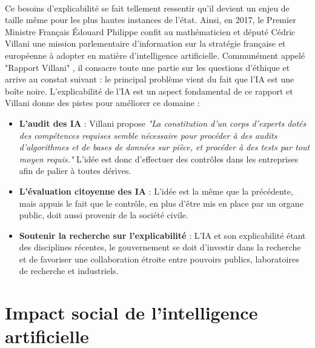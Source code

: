 \paragraph{}Ce besoins d'explicabilité se fait tellement ressentir qu'il devient un enjeu de taille même pour les plus hautes instances de l'état. Ainsi, en 2017, le Premier Ministre Français Édouard Philippe confit au mathématicien et député Cédric Villani une mission parlementaire d’information sur la stratégie française et européenne à adopter en matière d'intelligence artificielle. Communément appelé "Rapport Villani" \cite{rapportVillani}, il consacre toute une partie sur les questions d'éthique et arrive au constat suivant : le principal problème vient du fait que l'IA est une boîte noire. L'explicabilité de l'IA est un aspect fondamental de ce rapport et Villani donne des pistes pour améliorer ce domaine :
\begin{itemize}
    \item \textbf{L’audit des IA} : Villani propose \textit{"La constitution d’un corps d’experts dotés des compétences requises semble nécessaire pour procéder à des audits d’algorithmes et de bases de données sur pièce, et procéder à des tests par tout moyen requis."} L'idée est donc d'effectuer des contrôles dans les entreprises afin de palier à toutes dérives.
    \item \textbf{L’évaluation citoyenne des IA} : L'idée est la même que la précédente, mais appuis le fait que le contrôle, en plus d'être mis en place par un organe public, doit aussi provenir de la société civile.
    \item \textbf{Soutenir la recherche sur l’explicabilité} : L'IA et son explicabilité étant des disciplines récentes, le gouvernement se doit d'investir dans la recherche et de favoriser une collaboration étroite entre pouvoirs publics, laboratoires de recherche et industriels.
\end{itemize}

\section{Impact social de l'intelligence artificielle}

